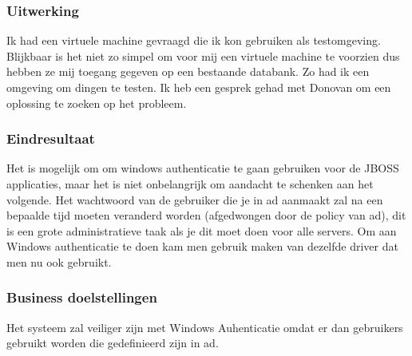 \subsubsection{Uitwerking}

Ik had een virtuele machine gevraagd die ik kon gebruiken als testomgeving. Blijkbaar is het niet zo simpel om voor mij een virtuele machine te voorzien dus hebben ze mij toegang gegeven op een bestaande databank. Zo had ik een omgeving om dingen te testen. Ik heb een gesprek gehad met Donovan om een oplossing te zoeken op het probleem.

\subsubsection{Eindresultaat}

Het is mogelijk om om windows authenticatie te gaan gebruiken voor de JBOSS applicaties, maar het is niet onbelangrijk om aandacht te schenken aan het volgende. Het wachtwoord van de gebruiker die je in \gls{ad} aanmaakt zal na een bepaalde tijd moeten veranderd worden (afgedwongen door de policy van \gls{ad}), dit is een grote administratieve taak als je dit moet doen voor alle servers. Om aan Windows authenticatie te doen kam men gebruik maken van dezelfde driver dat men nu ook gebruikt.

\subsubsection{Business doelstellingen}

Het systeem zal veiliger zijn met Windows Auhenticatie omdat er dan gebruikers gebruikt worden die gedefinieerd zijn in \gls{ad}.